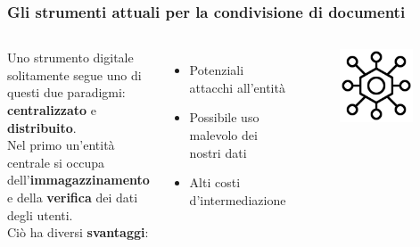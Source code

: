 \documentclass{beamer}
\begin{document}
\begin{frame}
	\frametitle{Gli strumenti attuali per la condivisione di documenti}
	\medskip
	\begin{columns}
		Uno strumento digitale solitamente segue uno di questi due paradigmi:
		\textbf{centralizzato} e \textbf{distribuito}. \\
		Nel primo un'entità centrale si occupa dell'\textbf{immagazzinamento} e della \textbf{verifica} dei dati
		degli utenti.\\ Ciò ha diversi \textbf{svantaggi}:
		\begin{itemize}
			\item Potenziali attacchi all'entità
			\item Possibile uso malevolo dei nostri dati
			\item Alti costi d'intermediazione
		\end{itemize}
		\begin{figure}
			\includegraphics[width=0.90\textwidth]{cent.png}
		\end{figure}
	\end{columns}
\end{frame}
\end{document}
